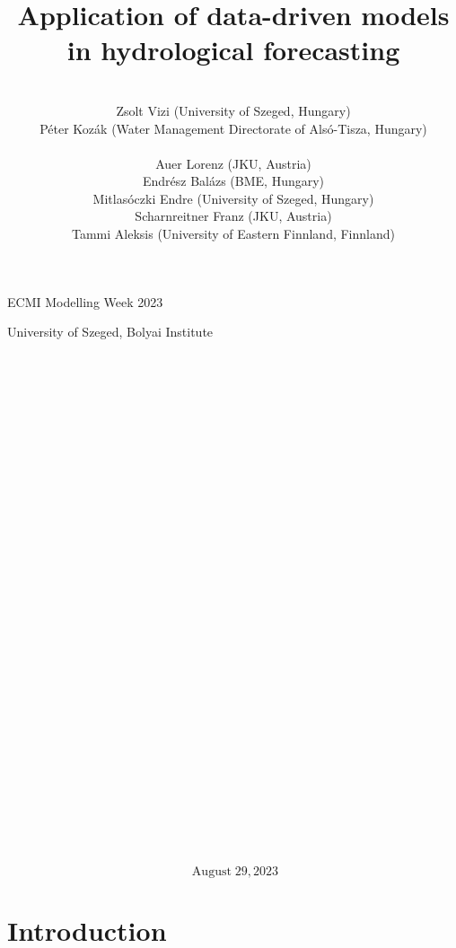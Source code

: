 \documentclass{article}
\newcommand{\tmaffiliation}[1]{\\ #1}
\newcommand{\tmop}[1]{\ensuremath{\operatorname{#1}}}
\begin{document}

ECMI Modelling Week 2023

University of Szeged, Bolyai Institute

\

\

\

\title{Application of data-driven models in hydrological forecasting}

\author{
  \tmaffiliation{Zsolt Vizi (University of Szeged, Hungary)\\
  P{\'e}ter Koz{\'a}k (Water Management Directorate of Als{\'o}-Tisza,
  Hungary)\\
  \\
  Auer Lorenz (JKU, Austria)\\
  Endr{\'e}sz Bal{\'a}zs (BME, Hungary)\\
  Mitlas{\'o}czki Endre (University of Szeged, Hungary)\\
  Scharnreitner Franz (JKU, Austria)\\
  Tammi Aleksis (University of Eastern Finnland, Finnland)}
}

\maketitle

\

\

\

\

\

\

\

\

\

\

\

\

\

\


\[ \tmop{August} 29, 2023 \]
{\newpage}

{\tableofcontents}

{\newpage}

\section{Introduction}
\end{document}
